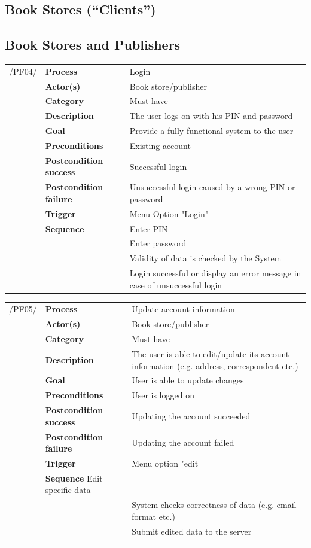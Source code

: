 \documentclass[11pt,a4paper,oneside,svgnames]{report}
\begin{document}
\subsection{Book Stores (``Clients'')}

\subsection{Book Stores and Publishers}

\noindent
\begin{tabular}{p{1.5cm}p{3cm}p{8cm}}
/PF04/	& \textbf{Process} & Login\\
		& \textbf{Actor(s)} & Book store/publisher\\
		& \textbf{Category} & Must have\\
		& \textbf{Description}	 & The user logs on with his PIN and password\\
		& \textbf{Goal} & Provide a fully functional system to the user\\
		& \textbf{Preconditions} & Existing account\\
		& \textbf{Postcondition success} & Successful login\\
		& \textbf{Postcondition failure} & Unsuccessful login caused by a wrong PIN or password\\
		& \textbf{Trigger} & Menu Option "Login"\\
		& \textbf{Sequence} & Enter PIN\\
		& & Enter password\\
		& & Validity of data is checked by the System\\
		& & Login successful or display an error message in case of unsuccessful login
		
\hfill \\
\end{tabular}

\noindent
\begin{tabular}{p{1.5cm}p{3cm}p{8cm}}
/PF05/	& \textbf{Process} & Update account information\\
		& \textbf{Actor(s)} & Book store/publisher\\
		& \textbf{Category} & Must have\\
		& \textbf{Description}	 & The user is able to edit/update its account information (e.g. address, correspondent etc.)\\
		& \textbf{Goal} & User is able to update changes\\
		& \textbf{Preconditions} & User is logged on\\
		& \textbf{Postcondition success} & Updating the account succeeded\\
		& \textbf{Postcondition failure} & Updating the account failed\\
		& \textbf{Trigger} & Menu option "edit\\
		& \textbf{Sequence} Edit specific data\\
		& & System checks correctness of data (e.g. email format etc.)\\
		& & Submit edited data to the server\\
		
\hfill \\
\end{tabular}
\end{document}
